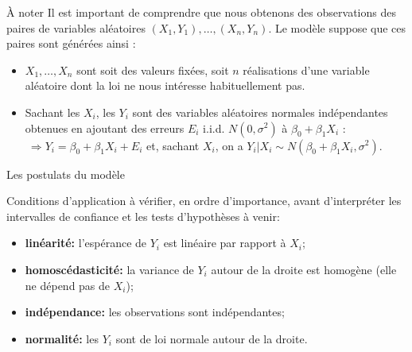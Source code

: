 \documentclass{BeamerTemplate}
\begin{document}
\begin{frame}[t]{À noter}
 Il est important de comprendre que nous obtenons des observations des paires de variables aléatoires $(X_1,Y_1),\dots,(X_n,Y_n)$. 
 Le modèle suppose que ces paires sont générées ainsi :
 \begin{itemize}
     \item<1-> $X_1,\dots,X_n$ sont soit des valeurs fixées, %
     soit $n$ réalisations d'une variable aléatoire dont la loi
     ne nous intéresse habituellement pas.
     \item<2-> Sachant les $X_i$, les $Y_i$ sont des
     variables aléatoires normales indépendantes obtenues en ajoutant
     des erreurs $E_i$ i.i.d. $N(0,\sigma^2)$ à $\beta_0+\beta_1X_i$ :
     \alert{$~\Rightarrow Y_i=\beta_0+\beta_1X_i+E_i$ et, sachant $X_i$,
     on a $Y_i|X_i\sim N(\beta_0+\beta_1X_i,\sigma^2)$}.
 \end{itemize}

\end{frame}

\begin{frame}[t]{Les postulats du modèle}

{\small
Conditions d'application à vérifier, en ordre d'importance, avant d'interpréter les intervalles de confiance et les tests d'hypothèses à venir:
\begin{itemize}\itemsep2mm
\item[P1] {\bf  linéarité:} l'espérance de $Y_i$ est linéaire par rapport à $X_i$;\\
    {}
\item[P2] {\bf homoscédasticité:}  la variance de $Y_i$ autour de la droite est homogène (elle ne dépend pas de $X_i$);\\
    {}
\item[P3]  {\bf indépendance:}  les observations sont indépendantes;\\
    {}
\item[P4]  {\bf  normalité:} les $Y_i$ sont de loi normale autour de la droite.\\
    {}
\end{itemize}
}
\end{frame}
\end{document}
